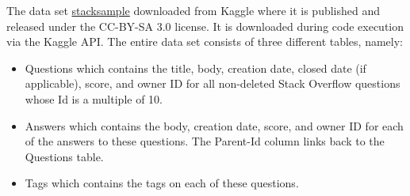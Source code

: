 \documentclass[12pt]{article}
\begin{document}
	The data set \href{https://www.kaggle.com/stackoverflow/stacksample}{stacksample}   downloaded from Kaggle where it is published and released under the CC-BY-SA 3.0 license. It is downloaded during code execution via the Kaggle API. The entire data set consists of three different tables, namely:
	\begin{itemize}
		\item Questions which contains the title, body, creation date, closed date (if applicable), score, and owner ID for all non-deleted Stack Overflow questions whose Id is a multiple of 10.
		\item Answers which contains the body, creation date, score, and owner ID for each of the answers to these questions. The Parent-Id column links back to the Questions table.
		\item Tags which contains the tags on each of these questions.
	\end{itemize}
\end{document}
